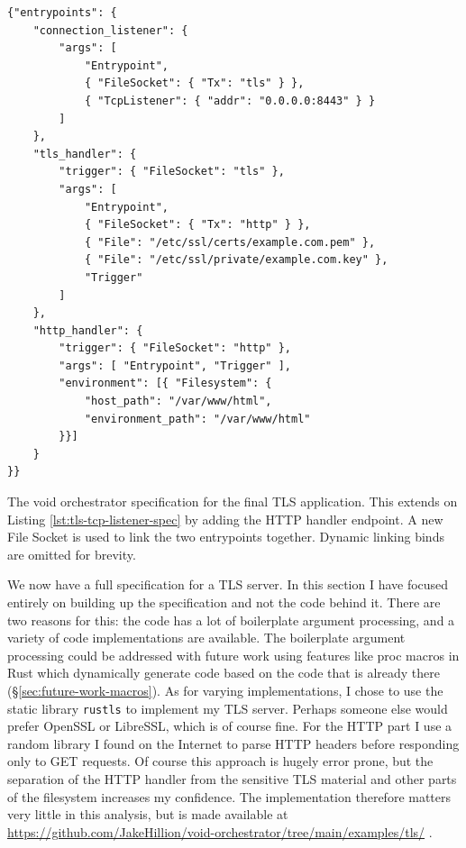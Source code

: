 \documentclass[12pt,a4paper,twoside]{report}
\newif\ifsubmission %
\begin{document}
\begin{listing}
\begin{verbatim}
{"entrypoints": {
    "connection_listener": {
        "args": [
            "Entrypoint",
            { "FileSocket": { "Tx": "tls" } },
            { "TcpListener": { "addr": "0.0.0.0:8443" } }
        ]
    },
    "tls_handler": {
        "trigger": { "FileSocket": "tls" },
        "args": [
            "Entrypoint",
            { "FileSocket": { "Tx": "http" } },
            { "File": "/etc/ssl/certs/example.com.pem" },
            { "File": "/etc/ssl/private/example.com.key" },
            "Trigger"
        ]
    },
    "http_handler": {
        "trigger": { "FileSocket": "http" },
        "args": [ "Entrypoint", "Trigger" ],
        "environment": [{ "Filesystem": {
            "host_path": "/var/www/html",
            "environment_path": "/var/www/html"
        }}]
    }
}}
\end{verbatim}

\caption{The void orchestrator specification for the final TLS application. This extends on Listing \ref{lst:tls-tcp-listener-spec} by adding the HTTP handler endpoint. A new File Socket is used to link the two entrypoints together. Dynamic linking binds are omitted for brevity.}
\label{lst:tls-spec}
\end{listing}

We now have a full specification for a TLS server. In this section I have focused entirely on building up the specification and not the code behind it. There are two reasons for this: the code has a lot of boilerplate argument processing, and a variety of code implementations are available. The boilerplate argument processing could be addressed with future work using features like proc macros in Rust which dynamically generate code based on the code that is already there (§\ref{sec:future-work-macros}). As for varying implementations, I chose to use the static library \texttt{rustls} to implement my TLS server. Perhaps someone else would prefer OpenSSL or LibreSSL, which is of course fine. For the HTTP part I use a random library I found on the Internet to parse HTTP headers before responding only to GET requests. Of course this approach is hugely error prone, but the separation of the HTTP handler from the sensitive TLS material and other parts of the filesystem increases my confidence. The implementation therefore matters very little in this analysis, but is made available at \ifsubmission \url{file:///SUBMITTED_SRC/void-orchestrator/examples/tls/} \else \url{https://github.com/JakeHillion/void-orchestrator/tree/main/examples/tls/} \fi.
\end{document}
